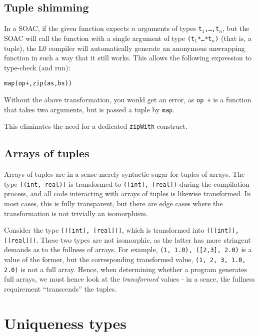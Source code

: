 \documentclass[oneside]{memoir}
\begin{document}
\subsection{Tuple shimming}

In a SOAC, if the given function expects $n$ arguments of types
\texttt{t$_{1}$,\ldots,{}t$_{n}$}, but the SOAC will call the function
with a single argument of type \texttt{(t$_{1}$*\ldots{}*t$_{n}$)}
(that is, a tuple), the L0 compiler will automatically generate an
anonymous unwrapping function in such a way that it still works.  This
allows the following expression to type-check (and run):

\begin{alltt}
  map(op +, zip(as, bs))
\end{alltt}

Without the above transformation, you would get an error, as
\texttt{op +} is a function that takes two arguments, but is passed a
tuple by \texttt{map}.

This eliminates the need for a dedicated \texttt{zipWith} construct.

\subsection{Arrays of tuples}

Arrays of tuples are in a sense merely syntactic sugar for tuples of
arrays.  The type \texttt{[(int, real)]} is transformed to
\texttt{([int], [real])} during the compilation process, and all code
interacting with arrays of tuples is likewise transformed.  In most
cases, this is fully transparent, but there are edge cases where the
transformation is not trivially an isomorphism.

Consider the type \texttt{[([int], [real])]}, which is transformed
into \texttt{([[int]], [[real]])}.  These two types are not
isomorphic, as the latter has more stringent demands as to the
fullness of arrays.  For example, \texttt{{({1}, {1.0}), ([2,3],
    {2.0})}} is a value of the former, but the corresponding
transformed value, \texttt{({{1}, {2, 3}}, {{1.0}, {2.0}})} is not a
full array.  Hence, when determining whether a program generates full
arrays, we must hence look at the \textit{transformed} values - in a
sence, the fullness requirement ``transcends'' the tuples.

\section{Uniqueness types}
\label{sec:l0-uniqueness-types}
\end{document}
